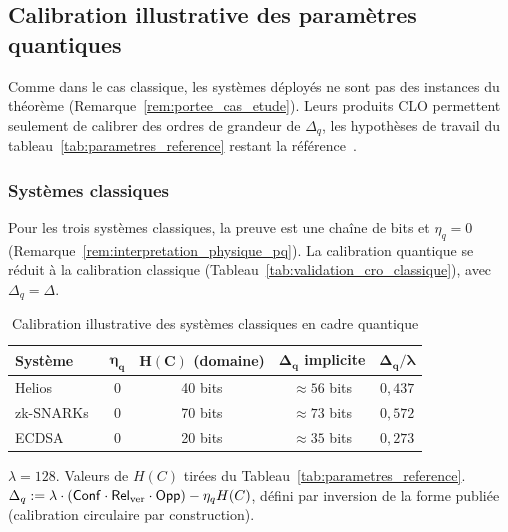 \subsection{Calibration illustrative des param\`etres quantiques}
\label{subsec:analyse_coherence_pq}
\begin{sloppypar}
Comme dans le cas classique, les syst\`emes d\'eploy\'es ne sont pas des
instances du th\'eor\`eme (Remarque~\ref{rem:portee_cas_etude}). Leurs
produits CLO permettent seulement de calibrer des ordres de grandeur
de $\Delta_q$, les hypoth\`eses de travail du tableau~\ref{tab:parametres_reference} restant la r\'ef\'erence~\cite{Adida08,Groth16,Johnson01,Dilithium2022,SPHINCS2022}.

\subsubsection{Syst\`emes classiques}

Pour les trois syst\`emes classiques, la preuve est une cha\^ine de bits et
$\eta_q = 0$ (Remarque~\ref{rem:interpretation_physique_pq}). La calibration
quantique se r\'eduit \`a la calibration classique
(Tableau~\ref{tab:validation_cro_classique}), avec $\Delta_q = \Delta$.

\begin{table}[htbp]
\centering
\caption{Calibration illustrative des syst\`emes classiques en cadre quantique}
\label{tab:validation_classiques_pq}
\begin{tabular}{@{}lcccc@{}}
\toprule
\textbf{Syst\`eme} & $\boldsymbol{\eta_q}$ & $\boldsymbol{H(C)}$ \textbf{(domaine)} & $\boldsymbol{\Delta_q}$ \textbf{implicite} & $\boldsymbol{\Delta_q/\lambda}$ \\
\midrule
Helios~\cite{Adida08,Adida09UCL} & $0$ & 40 bits & $\approx 56$ bits & $0{,}437$ \\
zk-SNARKs~\cite{Groth16,BCTV14} & $0$ & 70 bits & $\approx 73$ bits & $0{,}572$ \\
ECDSA~\cite{Johnson01,NIST.FIPS.186-5} & $0$ & 20 bits & $\approx 35$ bits & $0{,}273$ \\
\bottomrule
\end{tabular}
\begin{tablenotes}
\item \footnotesize $\lambda = 128$. Valeurs de $H(C)$ tir\'ees du Tableau~\ref{tab:parametres_reference}. $\Delta_q := \lambda \cdot (\mathsf{Conf}\cdot\mathsf{Rel}_{\mathrm{ver}}\cdot\mathsf{Opp}) - \eta_q H(C)$, d\'efini par inversion de la forme publi\'ee (calibration circulaire par construction).
\end{tablenotes}
\end{table}


\end{sloppypar}
